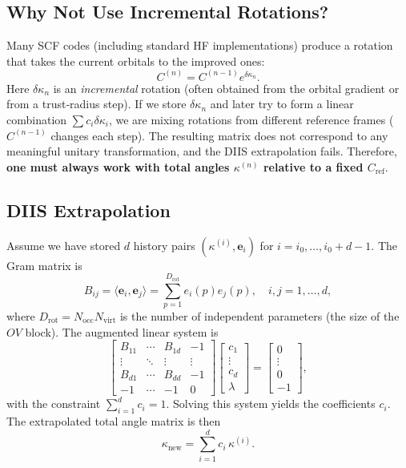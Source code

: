 \documentclass[12pt,a4paper]{article}
\begin{document}
\subsection{Why Not Use Incremental Rotations?}
Many SCF codes (including standard HF implementations) produce a rotation that takes the current orbitals to the improved ones:
\[
C^{(n)} = C^{(n-1)} e^{\delta\kappa_n}.
\]
Here $\delta\kappa_n$ is an \emph{incremental} rotation (often obtained from the orbital gradient or from a trust‑radius step). If we store $\delta\kappa_n$ and later try to form a linear combination $\sum c_i \delta\kappa_i$, we are mixing rotations from different reference frames ($C^{(n-1)}$ changes each step). The resulting matrix does not correspond to any meaningful unitary transformation, and the DIIS extrapolation fails. Therefore, \textbf{one must always work with total angles $\kappa^{(n)}$ relative to a fixed $C_{\text{ref}}$}.

\subsection{DIIS Extrapolation}
Assume we have stored $d$ history pairs $(\kappa^{(i)}, \mathbf{e}_i)$ for $i = i_0, \dots, i_0+d-1$. The Gram matrix is
\begin{equation}
B_{ij} = \langle \mathbf{e}_i, \mathbf{e}_j \rangle = \sum_{p=1}^{D_{\text{rot}}} e_i(p) e_j(p), \quad i,j=1,\dots,d,
\end{equation}
where $D_{\text{rot}} = N_{\text{occ}} N_{\text{virt}}$ is the number of independent parameters (the size of the $OV$ block). The augmented linear system is
\begin{equation}
\begin{bmatrix}
B_{11} & \cdots & B_{1d} & -1 \\
\vdots & \ddots & \vdots & \vdots \\
B_{d1} & \cdots & B_{dd} & -1 \\
-1 & \cdots & -1 & 0
\end{bmatrix}
\begin{bmatrix}
c_1 \\ \vdots \\ c_d \\ \lambda
\end{bmatrix}
=
\begin{bmatrix}
0 \\ \vdots \\ 0 \\ -1
\end{bmatrix},
\label{eq:diis}
\end{equation}
with the constraint $\sum_{i=1}^d c_i = 1$. Solving this system yields the coefficients $c_i$. The extrapolated total angle matrix is then
\begin{equation}
\kappa_{\text{new}} = \sum_{i=1}^d c_i \, \kappa^{(i)}.
\end{equation}
\end{document}
